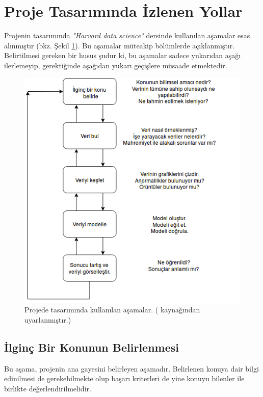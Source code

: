 \documentclass[12pt,a4paper]{article}
\renewcommand{\figurename}{Şekil}
\begin{document}
    \section{Proje Tasarımında İzlenen Yollar} \label{tasa}
    Projenin tasarımında \textit{"Harvard data science"} dersinde kullanılan
    aşamalar esas alınmıştır (bkz. \figurename{} \ref{flow}). Bu aşamalar müteakip bölümlerde
    açıklanmıştır. Belirtilmesi gereken bir husus şudur ki, bu aşamalar sadece
    yukarıdan aşağı ilerlemeyip, gerektiğinde aşağıdan yukarı geçişlere müsaade
    etmektedir.
    \begin{figure}
        \begin{center}
            \includegraphics[width=\linewidth]{resimler/flow.png}
            \caption{Projede tasarımında kullanılan aşamalar. (\cite{byrne} kaynağından uyarlanmıştır.)}
            \label{flow}
        \end{center}
    \end{figure}

    \subsection{İlginç Bir Konunun Belirlenmesi}
    Bu aşama, projenin ana gayesini belirleyen aşamadır. 
    Belirlenen konuya dair bilgi edinilmesi de gerekebilmekte olup
    başarı kriterleri de yine konuyu bilenler ile birlikte değerlendirilmelidir.
\end{document}
